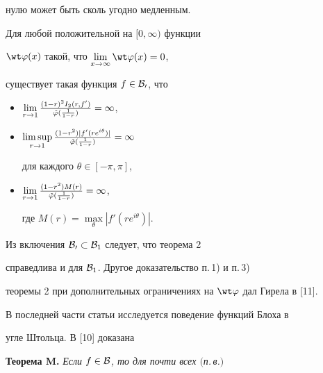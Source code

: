 нулю может быть сколь угодно медленным.





\begin{thm}


Для любой положительной на $[0,\infty)$ функции


$\wt\p(x)$ такой, что $\lim\limits_{x\to\infty}\wt\p(x)=0$,


существует такая функция $f\in{\cal B_0}$, что


\begin{itemize}


\item[1)]


$\lim\limits_{r\to 1}\frac{(1-r)^2I_2(r,f')}{\Tilde{\varphi}(\frac 1{1-r})}=\infty$,


\item[2)]


$\limsup\limits_{r\to 1}\frac{(1-r^2)


|f'(re^{i\theta})|}{\Tilde\p(\frac{1}{1-r})}=\infty$


для каждого $\theta\in [-\pi,\pi]$,


\item[3)] 


$\lim\limits_{r\to


1}\frac{(1-r^2)M(r)}{\Tilde\p(\frac{1}{1-r})}=\infty$,


где $M(r)=\max\limits_{\theta}|f'(re^{i\theta})|$.


\end{itemize}


\end{thm}








Из включения ${\cal B_0}\subset{\cal B}_1$ следует, что теорема 2


справедлива и для ${\cal B}_1$. Другое доказательство п.\,1) и п.\,3)


теоремы 2 при дополнительных ограничениях на $\wt\varphi$ дал Гирела в [11].





В последней части статьи исследуется поведение функций Блоха в


угле Штольца. В [10] доказана


\smallskip





{\bf Теорема M.} {\it Если $f\in {\cal B}$, то для почти всех $($п.\,в.$)$}


